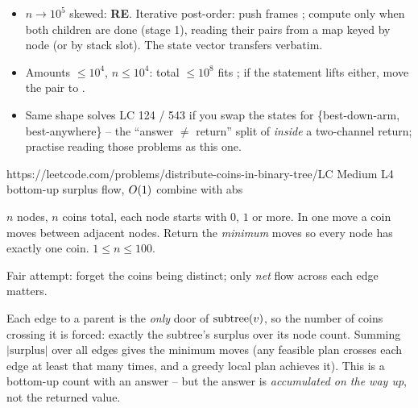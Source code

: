\begin{hardeningbox}
\begin{itemize}[nosep, leftmargin=1.4em]
  \item $n\to10^{5}$ skewed: \textbf{RE}. Iterative post-order: push frames
        ; compute  only when both
        children are done (stage 1), reading their pairs from a map keyed by node
        (or by stack slot). The state vector transfers verbatim.
  \item Amounts $\le 10^{4}$, $n\le10^{4}$: total $\le 10^{8}$ fits ;
        if the statement lifts either, move the pair to .
  \item Same shape solves LC 124 / 543 if you swap the states for
        \{best-down-arm, best-anywhere\} -- the ``answer $\ne$ return'' split of
         \emph{inside} a two-channel return; practise reading
        those problems as this one.
\end{itemize}
\end{hardeningbox}

  {https://leetcode.com/problems/distribute-coins-in-binary-tree/}{LC Medium L4}
  {bottom-up surplus flow, $O(1)$ combine with abs}

\begin{problemstatement}
$n$ nodes, $n$ coins total, each node starts with $0$, $1$ or more. In one move a
coin moves between adjacent nodes. Return the \emph{minimum} moves so every node
has exactly one coin. $1 \le n \le 100$.
\end{problemstatement}

\begin{attemptgate}
Fair attempt: forget the coins being distinct; only \emph{net} flow across each
edge matters.
\end{attemptgate}

Each edge to a parent is the \emph{only} door of $\operatorname{subtree}(v)$, so the number of
coins crossing it is forced: exactly the subtree's surplus over its node count.
Summing $|\text{surplus}|$ over all edges gives the minimum moves (any feasible
plan crosses each edge at least that many times, and a greedy local plan achieves
it). This is a bottom-up count with an  answer -- but the answer is
\emph{accumulated on the way up}, not the returned value.

